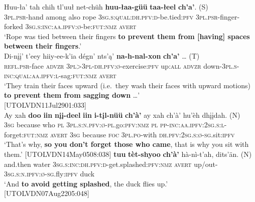 \documentclass[output=paper,colorlinks,citecolor=brown]{langscibook}
\begin{document}
\begin{exe}
\ex \label{undesirable}
\begin{xlista}
\ex\label{undesirablea}
\gll Huu-ła' tah chih tl'uuł net-chüh \textbf{huu-łaa-güü} \textbf{taa-łeel} \textbf{ch'a'}. \textnormal{(S}) \\
\textsc{3pl.psr}-hand among also rope \textsc{3sg.s:qual:dh.pfv:d}-be.tied:\textsc{pfv} \textsc{3pl.psr}-finger-forked \textsc{3sg.s:inc:aa.ipfv:ø}-be:\textsc{fut:nmz} \textsc{avert} \\
\glt `Rope was tied between their fingers \textbf{to prevent them from [having] spaces between their fingers}.' \hfill \citep[19]{TyoneM1996}\\
\ex\label{undesirableb}
\gll Di-nįį' t'eey hiiy-ee-k'ia dégn' nts'ą' \textbf{na-h-nal-xon} \textbf{ch'a'} {\ldots} \textnormal{(T)} \\
\textsc{refl.psr}-face \textsc{advzr} \textsc{3pl>3pl-dh.pfv:ø}-exercise:\textsc{pfv} up:\textsc{all} \textsc{advzr} down-\textsc{3pl.s-inc:qual:aa.ipfv:l}-sag:\textsc{fut:nmz} \textsc{avert} \\
\glt `They train their faces upward (i.e.\  they wash their faces with upward motions) \textbf{to prevent them from sagging down} \ldots' \\ \hfill [UTOLVDN11Jul2901:033] \\
\ex\label{undesirablec}
\gll Ay xah \textbf{doo} \textbf{iin} \textbf{nįį-deel} \textbf{iin} \textbf{i-tįl-nüü} \textbf{ch'à'} ay xah ch'à' hu'èh {dhįįdah. \textnormal{(N)}} \\
\textsc{3sg} because who \textsc{pl} \textsc{3pl.s:n.pfv:ø-pl}.go:\textsc{pfv:nmz} \textsc{pl} \textsc{pp-inc:aa.ipfv:2sg.s:l}-forget:\textsc{fut:nmz} \textsc{avert} \textsc{3sg} because \textsc{foc} \textsc{3pl.po}-with \textsc{dh.pfv:2sg.s:ø-sg}.sit:\textsc{ipfv} \\
\glt `That's why, \textbf{so you don't forget those who came}, that is why you sit with them.' \hfill [UTOLVDN14May0508:038] 
\ex\label{undesirabled}
 \textbf{tuu} \textbf{tèt-shyoo} \textbf{ch'à'} hà-nì-t'ah, dits'än. \textnormal{(N)}\\
and.then water \textsc{3sg.s:inc:dh.pfv:d}-get.splashed:\textsc{pfv:nmz} \textsc{avert} up/out-\textsc{3sg.s:n.ipfv:ø-sg}.fly:\textsc{ipfv} duck\\
\glt `And \textbf{to avoid getting splashed}, the duck flies up.' \\ \hfill [UTOLVDN07Aug2205:048]
\end{xlista}
\end{exe}
\end{document}
